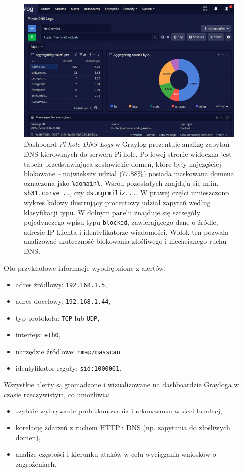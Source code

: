 \documentclass[
    left=2.5cm,         %
    right=2.5cm,        %
    top=2.5cm,          %
    bottom=3cm,         %
    bindingoffset=6mm,  %
    nohyphenation=true %
]{eiti/eiti-thesis} %
\begin{document}
\newpage
\begin{figure}[H]
    \centering
    \includegraphics[width=\textwidth]{img/graylog_dns.png}
    \caption{Dashboard \textit{Pi-hole DNS Logs} w Graylog prezentuje analizę zapytań DNS kierowanych do serwera Pi-hole. Po lewej stronie widoczna jest tabela przedstawiająca zestawienie domen, które były najczęściej blokowane – największy udział (77{,}88\%) posiada maskowana domena oznaczona jako \texttt{\%domain\%}. Wśród pozostałych znajdują się m.in. \texttt{sh31.corve...},  czy \texttt{ds.mgrmiliz...}. W prawej części umieszczono wykres kołowy ilustrujący procentowy udział zapytań według klasyfikacji typu. W dolnym panelu znajduje się szczegóły pojedynczego wpisu typu \texttt{blocked}, zawierającego dane o źródle, adresie IP klienta i identyfikatorze wiadomości. Widok ten pozwala analizować skuteczność blokowania złośliwego i niechcianego ruchu DNS.}
    \label{fig:graylog-dns-blocks}
\end{figure}


Oto przykładowe informacje wyodrębnione z alertów:
\begin{itemize}
    \item adres źródłowy: \texttt{192.168.1.5},
    \item adres docelowy: \texttt{192.168.1.44},
    \item typ protokołu: \texttt{TCP} lub \texttt{UDP},
    \item interfejs: \texttt{eth0},
    \item narzędzie źródłowe: \texttt{nmap/masscan},
    \item identyfikator reguły: \texttt{sid:1000001}.
\end{itemize}

Wszystkie alerty są gromadzone i wizualizowane na dashboardzie Grayloga w czasie rzeczywistym, co umożliwia:
\begin{itemize}
    \item szybkie wykrywanie prób skanowania i rekonesansu w sieci lokalnej,
    \item korelację zdarzeń z ruchem HTTP i DNS (np. zapytania do złośliwych domen),
    \item analizę częstości i kierunku ataków w celu wyciągania wniosków o zagrożeniach.
\end{itemize}
\end{document}
